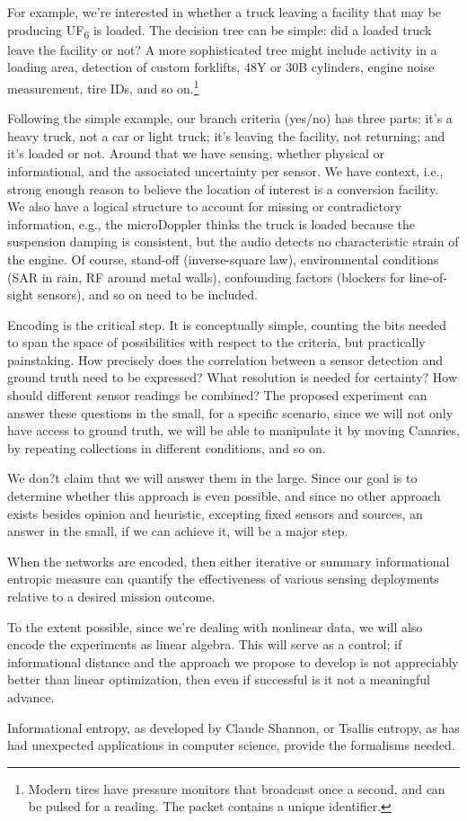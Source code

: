 \documentclass{article} %
\begin{document}
For example, we're interested in whether a truck leaving a facility that may be producing UF\textsubscript{6} is loaded. The decision tree can be simple: did a loaded truck leave the facility or not? A more sophisticated tree might include activity in a loading area, detection of custom forklifts, 48Y or 30B cylinders, engine noise measurement, tire IDs, and so on.\footnote{ Modern tires have pressure monitors that broadcast once a second, and can be pulsed for a reading. The packet contains a unique identifier.}

Following the simple example, our branch criteria (yes/no) has three parts: it's a heavy truck, not a car or light truck; it's leaving the facility, not returning; and it's loaded or not. Around that we have sensing, whether physical or informational, and the associated uncertainty per sensor. We have context, i.e., strong enough reason to believe the location of interest is a conversion facility. We also have a logical structure to account for missing or contradictory information, e.g., the microDoppler thinks the truck is loaded because the suspension damping is consistent, but the audio detects no characteristic strain of the engine. Of course, stand-off (inverse-square law), environmental conditions (SAR in rain, RF around metal walls), confounding factors (blockers for line-of-sight sensors), and so on need to be included. 

Encoding is the critical step. It is conceptually simple, counting the bits needed to span the space of possibilities with respect to the criteria, but practically painstaking. How precisely does the correlation between a sensor detection and ground truth need to be expressed? What resolution is needed for certainty? How should different sensor readings be combined? The proposed experiment can answer these questions  in the small, for a specific scenario, since we will not only have access to ground truth, we will be able to manipulate it by moving Canaries, by repeating collections in different conditions, and so on. 

We don?t claim that we will answer them in the large. Since our goal is to determine whether this approach is even possible, and since no other approach exists besides opinion and heuristic, excepting fixed sensors and sources, an answer in the small, if we can achieve it, will be a major step.

When the networks are encoded, then either iterative or summary informational entropic measure can quantify the effectiveness of various sensing deployments relative to a desired mission outcome. 

To the extent possible, since we're dealing with nonlinear data, we will also encode the experiments as linear algebra. This will serve as a control; if informational distance and the approach we propose to develop is not appreciably better than linear optimization, then even if successful is it not a meaningful advance.

Informational entropy, as developed by Claude Shannon, or Tsallis entropy, as has had unexpected applications in computer science, provide the formalisms needed.
\end{document}
